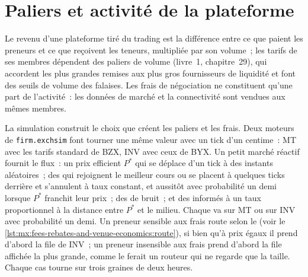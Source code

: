 \section{Paliers et activité de la plateforme}

Le revenu d'une plateforme tiré du trading est la différence entre ce que paient les preneurs et ce que reçoivent les teneurs, multipliée par son volume~; les tarifs de ses membres dépendent des
paliers de volume (livre~1, chapitre~29), qui accordent les plus grandes remises aux plus gros fournisseurs de liquidité et font des seuils de volume des falaises.
Les frais de négociation ne constituent qu'une part de l'activité~: les données de marché et la connectivité sont vendues aux mêmes membres.

La simulation construit le choix que créent les paliers et les frais. Deux moteurs de \texttt{firm.exchsim} font tourner une même valeur avec un tick d'un centime~: MT avec les tarifs standard de BZX,
INV avec ceux de BYX. Un petit marché réactif fournit le flux~: un prix efficient $P^\ast$ qui se déplace d'un tick à des instants aléatoires~; des 
qui rejoignent le meilleur cours ou se placent à quelques ticks derrière et s'annulent à taux constant, et aussitôt avec probabilité un demi lorsque $P^\ast$ franchit
leur prix~; des  de bruit~; et des  informés à un taux proportionnel à la distance entre $P^\ast$ et le milieu. Chaque  va sur MT
ou sur INV avec probabilité un demi. Un preneur sensible aux frais route selon le  (voir le \cref{lst:mx:fees-rebates-and-venue-economics:route}), si bien qu'à prix égaux
il prend d'abord la file de INV~; un preneur insensible aux frais prend d'abord la file affichée la plus grande, comme le ferait un routeur qui ne regarde que la taille. Chaque cas tourne
sur trois graines de deux heures.

\label{lst:mx:fees-rebates-and-venue-economics:takers}

